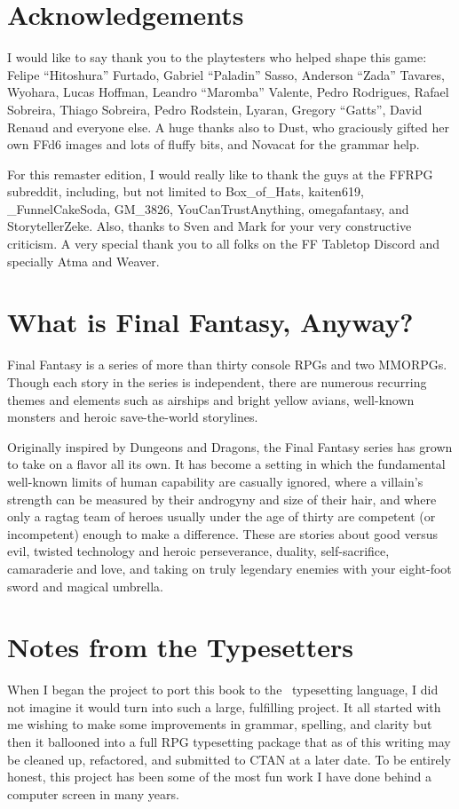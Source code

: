 \begin{multicols}{2}
\section{Acknowledgements}\label{sec:acknowledgements}
I would like to say thank you to the playtesters who helped shape this game: Felipe “Hitoshura” Furtado, Gabriel “Paladin” Sasso, Anderson “Zada” Tavares, Wyohara, Lucas Hoffman, Leandro “Maromba” Valente, Pedro Rodrigues, Rafael Sobreira, Thiago Sobreira, Pedro Rodstein, Lyaran, Gregory “Gatts”, David Renaud and everyone else. A huge thanks also to Dust, who graciously gifted her own FFd6 images and lots of fluffy bits, and Novacat for the grammar
help. \pw%

For this remaster edition, I would really like to thank the guys at the FFRPG subreddit, including, but not limited to Box\_of\_Hats, kaiten619, \_FunnelCakeSoda, GM\_3826, YouCanTrustAnything, omegafantasy, and StorytellerZeke. Also, thanks to Sven and Mark for your very constructive criticism. A very special thank you to all folks on the FF Tabletop Discord and specially Atma and Weaver.

\section{What is Final Fantasy, Anyway?}\label{sec:whatff}
Final Fantasy is a series of more than thirty console RPGs and two MMORPGs. Though each story in the series is independent, there are numerous recurring themes and elements such as airships and bright yellow avians, well-known monsters and heroic save-the-world storylines.

Originally inspired by Dungeons and Dragons, the Final Fantasy series has grown to take on a flavor all its own. It has become a setting in which the fundamental well-known limits of human capability are casually ignored, where a villain’s strength can be measured by their androgyny and size of their hair, and where only a ragtag team of heroes usually under the age of thirty are competent (or incompetent) enough to make a difference. These are stories about good versus evil, twisted technology and heroic perseverance, duality, self-sacrifice, camaraderie and love, and taking on truly legendary enemies with your eight-foot sword and magical umbrella.

\section{Notes from the Typesetters}\label{sec:forward-typesetting}
When I began the project to port this book to the \XeLaTeX\ typesetting language, I did not imagine it would turn into such a large, fulfilling project. It all started with me wishing to make some improvements in grammar, spelling, and clarity but then it ballooned into a full RPG typesetting package that as of this writing may be cleaned up, refactored, and submitted to CTAN at a later date. To be entirely honest, this project has been some of the most fun work I have done behind a computer screen in many years.\pc%


\end{multicols}
